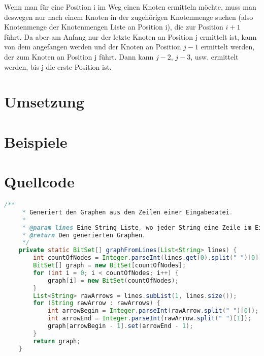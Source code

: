 \documentclass[a4paper,10pt,ngerman]{scrartcl}
\begin{document}
	Wenn man für eine Position i im Weg einen Knoten ermitteln möchte,
	muss man deswegen nur nach einem Knoten in der zugehörigen Knotenmenge suchen
	(also Knotenmenge der Knotenmengen Liste an Position i),
	die zur Position $i + 1$ führt.
	Da aber am Anfang nur der letzte Knoten an Position j ermittelt ist,
	kann von dem angefangen werden und der Knoten an Position $j - 1$ ermittelt werden,
	der zum Knoten an Position j führt.
	Dann kann $j - 2$, $j - 3$, usw. ermittelt werden,
	bis j die erste Position ist.


    \section{Umsetzung}\label{sec:umsetzung}


    \section{Beispiele}\label{sec:beispiele}


    \section{Quellcode}\label{sec:quellcode}\label{LastPage}
    \begin{lstlisting}[frame=single,language=Java,title=Methode graphFromLines,breaklines=true]
    /**
     * Generiert den Graphen aus den Zeilen einer Eingabedatei.
     *
     * @param lines Eine String Liste, wo jeder String eine Zeile im Eingabeformat ist.
     * @return Den generierten Graphen.
     */
    private static BitSet[] graphFromLines(List<String> lines) {
        int countOfNodes = Integer.parseInt(lines.get(0).split(" ")[0]);
        BitSet[] graph = new BitSet[countOfNodes];
        for (int i = 0; i < countOfNodes; i++) {
            graph[i] = new BitSet(countOfNodes);
        }
        List<String> rawArrows = lines.subList(1, lines.size());
        for (String rawArrow : rawArrows) {
            int arrowBegin = Integer.parseInt(rawArrow.split(" ")[0]);
            int arrowEnd = Integer.parseInt(rawArrow.split(" ")[1]);
            graph[arrowBegin - 1].set(arrowEnd - 1);
        }
        return graph;
    }
	\end{lstlisting}
	
\end{document}
